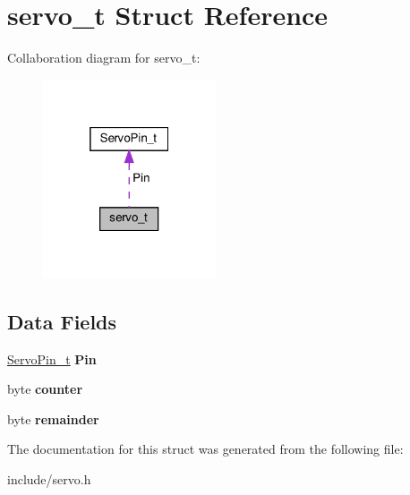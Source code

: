\hypertarget{structservo__t}{}\section{servo\+\_\+t Struct Reference}
\label{structservo__t}


Collaboration diagram for servo\+\_\+t\+:
\nopagebreak
\begin{figure}[H]
\begin{center}
\leavevmode
\includegraphics[width=145pt]{structservo__t__coll__graph}
\end{center}
\end{figure}
\subsection*{Data Fields}
\begin{DoxyCompactItemize}
\item 
\mbox{\label{structservo__t_a04bcc6cf13ea5cd2c4dabdc977e054cb}} 
\hyperlink{structServoPin__t}{Servo\+Pin\+\_\+t} {\bfseries Pin}
\item 
\mbox{\label{structservo__t_a53257182227ffeab61fc89f0d944ad18}} 
byte {\bfseries counter}
\item 
\mbox{\label{structservo__t_af5b6543b13ee199bd1e261f81b17fe6f}} 
byte {\bfseries remainder}
\end{DoxyCompactItemize}


The documentation for this struct was generated from the following file\+:\begin{DoxyCompactItemize}
\item 
include/servo.\+h\end{DoxyCompactItemize}
